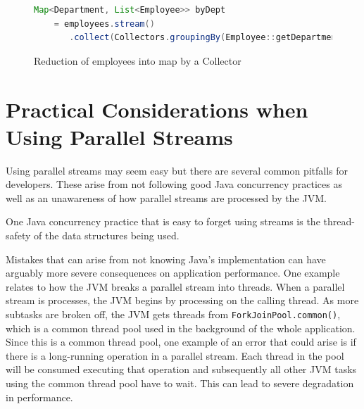 \documentclass[oneside, a4paper, 11pt]{article}
\begin{document}
\begin{figure}[H]
\begin{lstlisting}[language=Java]
Map<Department, List<Employee>> byDept
    = employees.stream()
       .collect(Collectors.groupingBy(Employee::getDepartment));
\end{lstlisting}
\caption{Reduction of employees into map by a Collector}
\label{fig:employee_collection}
\end{figure}
\section{Practical Considerations when Using Parallel Streams}
Using parallel streams may seem easy but there are several common pitfalls for developers. These arise from not following good Java concurrency practices as well as an unawareness of how parallel streams are processed by the JVM.

One Java concurrency practice that is easy to forget using streams is the thread-safety of the data structures being used.

Mistakes that can arise from not knowing Java's implementation can have arguably more severe consequences on application performance. One example relates to how the JVM breaks a parallel stream into threads. When a parallel stream is processes, the JVM begins by processing on the calling thread. As more subtasks are broken off, the JVM gets threads from \verb|ForkJoinPool.common()|, which is a common thread pool used in the background of the whole application. Since this is a common thread pool, one example of an error that could arise is if there is a long-running operation in a parallel stream. Each thread in the pool will be consumed executing that operation and subsequently all other JVM tasks using the common thread pool have to wait. This can lead to severe degradation in performance.
\end{document}
